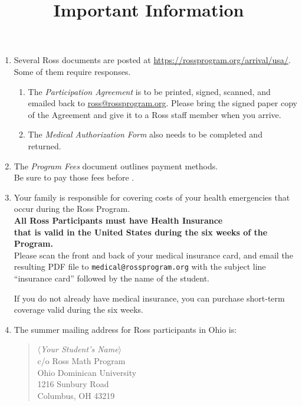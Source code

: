 \documentclass[11pt]{ross}
\title{Important Information}
\newcommand{\spa}{\hspace*{1cm}}
\newcommand{\spz}{\hspace*{5mm}}
\begin{document}
\maketitle
 \begin{enumerate}[label=(\arabic*),itemsep=2em,topsep=-1em]
\item Several Ross documents are posted at \url{https://rossprogram.org/arrival/usa/}.  \\
Some of them require responses.  
 \begin{enumerate}[label=(\alph*),itemsep=0.5em,topsep=0em]
\item The {\it Participation Agreement} is to be printed, signed, scanned, and emailed back to 
\href{mailto:ross@rossprogram.org}{ross@rossprogram.org}.  Please bring the signed paper copy of the Agreement and give it to a Ross staff member when you arrive. 
\item The {\it Medical Authorization Form} also needs to be completed and returned.
\end{enumerate}

\item The \textit{Program Fees} document outlines payment methods.  \\
\spa Be sure to pay those fees before \feeduedate.

\item Your family is responsible for covering costs of your health
emergencies that occur during the Ross Program.\\
\spz  \textbf{All Ross Participants must have Health Insurance \\
\spz that is valid in the United States during the six weeks of the Program.} \\[5pt]
   Please scan the front and back of your medical insurance card, and email the resulting PDF file to
\texttt{medical@rossprogram.org} with the subject line ``insurance card''
followed by the name of the student. 

If you do not already have medical insurance, you can purchase short-term coverage valid during the six weeks.

\item The summer mailing address for Ross participants in Ohio is:
\begin{quote}
\textit{$\langle$Your Student's Name$\rangle$} \\
c/o Ross Math Program\\
Ohio Dominican University \\
1216 Sunbury Road \\
Columbus, OH 43219
\end{quote}


\end{enumerate}
\end{document}
